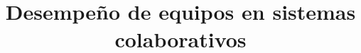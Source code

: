 \documentclass[12pt,letterpaper,spanish]{article}
\begin{document}
\title{Desempeño de equipos en sistemas colaborativos}

\marginsize{2.5cm}{2.5cm}{3cm}{3cm}
\tableofcontents
\newpage




\newpage


\end{document}
